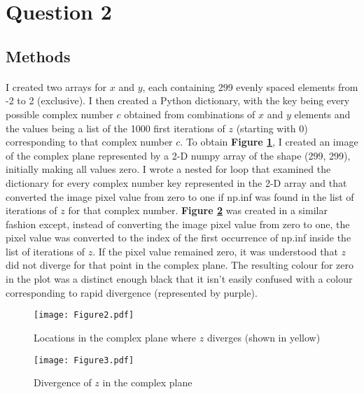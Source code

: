 \documentclass{article}
\begin{document}
\section{Question 2}

\subsection{Methods}

\paragraph{}
I created two arrays for $x$ and $y$, each containing 299 evenly spaced elements from -2 to 2 (exclusive). I then created a Python dictionary, with the key being every possible complex number $c$ obtained from combinations of $x$ and $y$ elements and the values being a list of the 1000 first iterations of $z$ (starting with 0) corresponding to that complex number $c$. To obtain \textbf{Figure \ref{fig2}}, I created an image of the complex plane represented by a 2-D numpy array of the shape (299, 299), initially making all values zero. I wrote a nested for loop that examined the dictionary for every complex number key represented in the 2-D array and that converted the image pixel value from zero to one if np.inf was found in the list of iterations of $z$ for that complex number. \textbf{Figure \ref{fig3}} was created in a similar fashion except, instead of converting the image pixel value from zero to one, the pixel value was converted to the index of the first occurrence of np.inf inside the list of iterations of $z$. If the pixel value remained zero, it was understood that $z$ did not diverge for that point in the complex plane. The resulting colour for zero in the plot was a distinct enough black that it isn't easily confused with a colour corresponding to rapid divergence (represented by purple).

\begin{figure}[H]
\begin{center}
\texttt{[image: Figure2.pdf]}
\caption{Locations in the complex plane where $z$ diverges (shown in yellow) \textbf{\label{fig2}}}
\end{center}
\end{figure}

\begin{figure}[H]
\begin{center}
\texttt{[image: Figure3.pdf]}
\caption{Divergence of $z$ in the complex plane \textbf{\label{fig3}}}
\end{center}
\end{figure}
\end{document}
